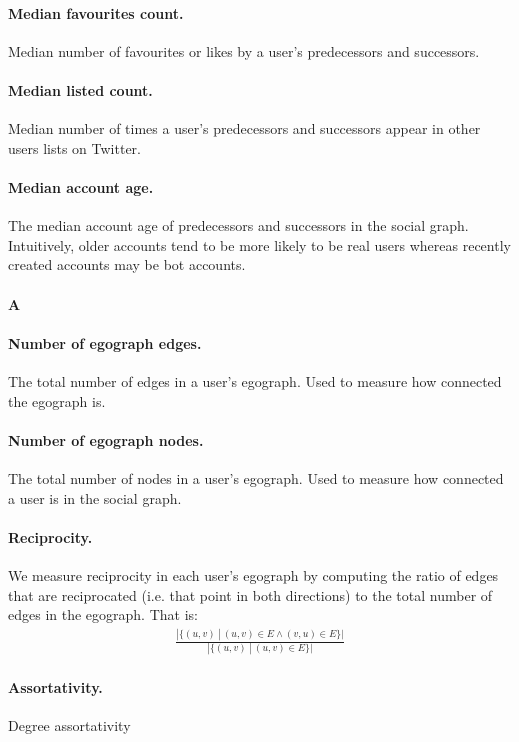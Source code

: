 \paragraph{Median favourites count.} Median number of favourites or likes by a user's predecessors and successors.

\paragraph{Median listed count.} Median number of times a user's predecessors and successors appear in other users lists on Twitter.

\paragraph{Median account age.} The median account age of predecessors and successors in the social graph. Intuitively, older accounts tend to be more likely to be real users whereas recently created accounts may be bot accounts.

\paragraph{A}

\paragraph{Number of egograph edges.} The total number of edges in a user's egograph. Used to measure how connected the egograph is.

\paragraph{Number of egograph nodes.} The total number of nodes in a user's egograph. Used to measure how connected a user is in the social graph.

\paragraph{Reciprocity.} We measure reciprocity in each user's egograph by computing the ratio of edges that are reciprocated (i.e. that point in both directions) to the total number of edges in the egograph. That is:
\begin{align*}
    \frac{|\{(u,v) \ | \ (u,v) \in E \wedge (v,u) \in E \}|}{|\{ (u,v) \ | \ (u,v) \in E \}|}
\end{align*}

\paragraph{Assortativity.} Degree assortativity

